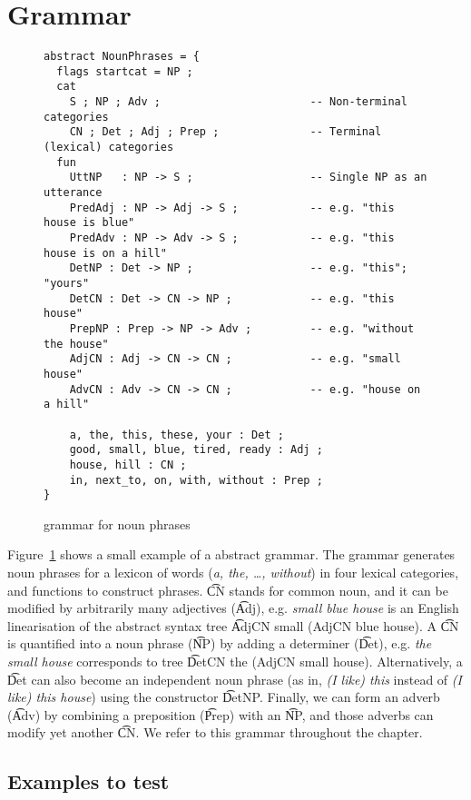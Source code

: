 \section{Grammar}


\begin{figure}[h]
  \centering
\begin{verbatim}
abstract NounPhrases = {
  flags startcat = NP ;
  cat
    S ; NP ; Adv ;                       -- Non-terminal categories
    CN ; Det ; Adj ; Prep ;              -- Terminal (lexical) categories
  fun
    UttNP   : NP -> S ;                  -- Single NP as an utterance
    PredAdj : NP -> Adj -> S ;           -- e.g. "this house is blue"
    PredAdv : NP -> Adv -> S ;           -- e.g. "this house is on a hill"
    DetNP : Det -> NP ;                  -- e.g. "this"; "yours"
    DetCN : Det -> CN -> NP ;            -- e.g. "this house"
    PrepNP : Prep -> NP -> Adv ;         -- e.g. "without the house"
    AdjCN : Adj -> CN -> CN ;            -- e.g. "small house"
    AdvCN : Adv -> CN -> CN ;            -- e.g. "house on a hill"

    a, the, this, these, your : Det ;
    good, small, blue, tired, ready : Adj ;
    house, hill : CN ;
    in, next_to, on, with, without : Prep ; 
}
\end{verbatim}
  \caption{\gf{} grammar for noun phrases}
\label{fig:exampleGrammar}
\end{figure}

Figure~\ref{fig:exampleGrammar} shows a small example of a \gf{}
abstract grammar. The grammar generates noun phrases for a lexicon of
\numOfLex{} words (\emph{a, the, \dots, without}) in four lexical
categories, and \numOfFun{} functions to construct phrases. \t{CN} stands
for common noun, and it can be modified by arbitrarily many adjectives
(\t{Adj}), e.g. \emph{small blue house} is an English linearisation of
the abstract syntax tree \t{AdjCN small (AdjCN blue house)}. A \t{CN}
is quantified into a noun phrase (\t{NP}) by adding a determiner
(\t{Det}), e.g. \emph{the small house} corresponds to tree \t{DetCN
  the (AdjCN small house)}. Alternatively, a \t{Det} can also become
an independent noun phrase (as in, \emph{(I like) this} instead of
\emph{(I like) this house}) using the constructor \t{DetNP}. Finally,
we can form an adverb (\t{Adv}) by combining a preposition (\t{Prep})
with an \t{NP}, and those adverbs can modify yet another \t{CN}.  We
refer to this grammar throughout the chapter.

\subsection{Examples to test}
\label{gf-testing-examples}

